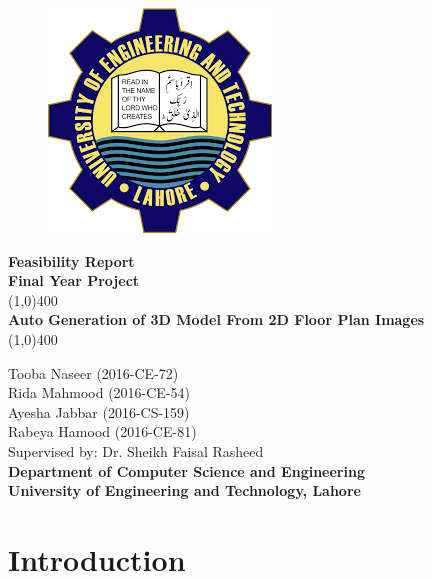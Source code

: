 \documentclass{article}
\begin{document}
\begin{titlepage}
\begin{center}
\vspace*{1cm}
\begin{figure}[h!]
\centering
\includegraphics[scale=0.5]{logo}
\end{figure}
\Large\textbf{Feasibility Report}\\
\Large\textbf{Final Year Project}\\
\vfill
\line(1,0){400}\\[1mm]
\huge{\textbf{Auto Generation of 3D Model From 2D Floor Plan Images}}\\[3mm]
\line(1,0){400}\\
\vfill

\large{Tooba Naseer  (2016-CE-72)}\\
\large{Rida Mahmood  (2016-CE-54)}\\
\large{Ayesha Jabbar  (2016-CS-159)}\\
\large{Rabeya Hamood  (2016-CE-81)}\\
\large{Supervised by: Dr. Sheikh Faisal Rasheed}\\
\large{\textbf{Department of Computer Science and Engineering}}\\
\large{\textbf{University of Engineering and Technology, Lahore}}\\
\end{center}
\end{titlepage}
\tableofcontents
\thispagestyle{empty}
\clearpage
\setcounter{page}{1}

\makeatletter
\newcommand{\heading}[1]%
{\par\vskip 1.5ex \@plus .2ex
 \hangindent=1em
 \noindent\makebox[1em][l]{$\,\bullet$}\textbf{\large #1}%
\par\vskip 1.5ex \@plus .2ex
\@afterheading}
\makeatother

\section{Introduction}
\end{document}
